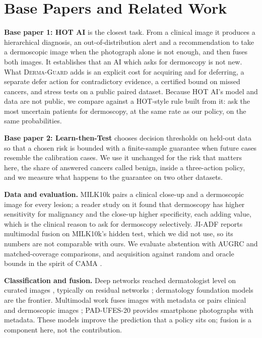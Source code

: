 \documentclass[conference]{IEEEtran}
\newcommand{\dguard}{\textsc{Derma-Guard}}
\begin{document}
\section{Base Papers and Related Work}\label{sec:related}

\textbf{Base paper 1: HOT AI} \cite{mehta2025hotai} is the closest task. From a clinical
image it produces a hierarchical diagnosis, an out-of-distribution alert and a
recommendation to take a dermoscopic image when the photograph alone is not enough, and
then fuses both images. It establishes that an AI which asks for dermoscopy is not new.
What \dguard{} adds is an explicit cost for acquiring and for deferring, a separate defer
action for contradictory evidence, a certified bound on missed cancers, and stress tests on
a public paired dataset. Because HOT AI's model and data are not public, we compare against
a HOT-style rule built from it: ask the most uncertain patients for dermoscopy, at the same
rate as our policy, on the same probabilities.

\textbf{Base paper 2: Learn-then-Test} \cite{angelopoulos2025ltt} chooses decision
thresholds on held-out data so that a chosen risk is bounded with a finite-sample guarantee
when future cases resemble the calibration cases. We use it unchanged for the risk that
matters here, the share of answered cancers called benign, inside a three-action policy, and
we measure what happens to the guarantee on two other datasets.

\textbf{Data and evaluation.} MILK10k \cite{milk10k} pairs a clinical close-up and a
dermoscopic image for every lesion; a reader study on it \cite{muller2026jaad} found that
dermoscopy has higher sensitivity for malignancy and the close-up higher specificity, each
adding value, which is the clinical reason to ask for dermoscopy selectively. JI-ADF
\cite{jiadf2026} reports multimodal fusion on MILK10k's hidden test, which we did not use, so
its numbers are not comparable with ours. We evaluate abstention with AUGRC
\cite{traub2024augrc} and matched-coverage comparisons, and acquisition against random and
oracle bounds in the spirit of CAMA \cite{rheude2025cama}.

\textbf{Classification and fusion.} Deep networks reached dermatologist level on curated
images \cite{esteva2017}, typically on residual networks \cite{he2016resnet}; dermatology
foundation models \cite{yan2025panderm} are the frontier. Multimodal work fuses images with
metadata \cite{pacheco2021metablock} or pairs clinical and dermoscopic images
\cite{kawahara2019derm7pt}; PAD-UFES-20 \cite{pacheco2020padufes} provides smartphone
photographs with metadata. These models improve the prediction that a policy sits on; fusion
is a component here, not the contribution.
\end{document}
